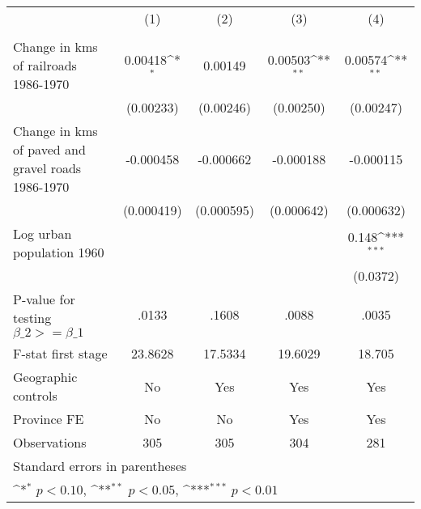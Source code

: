 {
\def\sym#1{\ifmmode^{#1}\else\(^{#1}\)\fi}
\begin{tabular}{l*{4}{c}}
\hline\hline
                &\multicolumn{1}{c}{(1)}&\multicolumn{1}{c}{(2)}&\multicolumn{1}{c}{(3)}&\multicolumn{1}{c}{(4)}\\
                &\multicolumn{1}{c}{}&\multicolumn{1}{c}{}&\multicolumn{1}{c}{}&\multicolumn{1}{c}{}\\
\hline
Change in kms of railroads 1986-1970&  0.00418\sym{*}  &  0.00149         &  0.00503\sym{**} &  0.00574\sym{**} \\
                &(0.00233)         &(0.00246)         &(0.00250)         &(0.00247)         \\
[1em]
Change in kms of paved and gravel roads 1986-1970&-0.000458         &-0.000662         &-0.000188         &-0.000115         \\
                &(0.000419)         &(0.000595)         &(0.000642)         &(0.000632)         \\
[1em]
Log urban population 1960&                  &                  &                  &    0.148\sym{***}\\
                &                  &                  &                  & (0.0372)         \\
\hline
P-value for testing $\beta\_{2} >= \beta\_{1}$&    .0133         &    .1608         &    .0088         &    .0035         \\
F-stat first stage&  23.8628         &  17.5334         &  19.6029         &   18.705         \\
Geographic controls&       No         &      Yes         &      Yes         &      Yes         \\
Province FE     &       No         &       No         &      Yes         &      Yes         \\
Observations    &      305         &      305         &      304         &      281         \\
\hline\hline
\multicolumn{5}{l}{\footnotesize Standard errors in parentheses}\\
\multicolumn{5}{l}{\footnotesize \sym{*} \(p<0.10\), \sym{**} \(p<0.05\), \sym{***} \(p<0.01\)}\\
\end{tabular}
}
